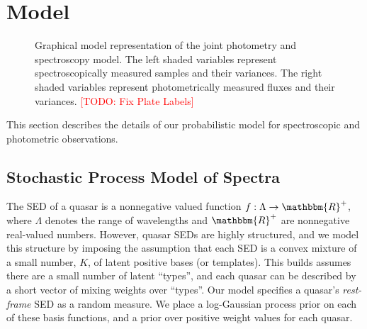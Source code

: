 \documentclass{article}
\newcommand{\R}{\mathbbm{R}}
\newcommand{\red}[1]{\textcolor{red}{[TODO: #1]}}
\begin{document}


\section{Model}

\begin{figure}

\caption{Graphical model representation of the joint photometry and spectroscopy model.  The left shaded variables represent spectroscopically measured samples and their variances.  The right shaded variables represent photometrically measured fluxes and their variances. \red{Fix Plate Labels} }
\end{figure}


\label{sec:model}
This section describes the details of our probabilistic model for spectroscopic and photometric observations.  

\subsection{Stochastic Process Model of Spectra}
The SED of a quasar is a nonnegative valued function $f : \Lambda \rightarrow \R^+$, where $\Lambda$ denotes the range of wavelengths and $\R^+$ are nonnegative real-valued numbers.  However, quasar SEDs are highly structured, and we model this structure by imposing the assumption that each SED is a convex mixture of a small number, $K$, of latent positive bases (or templates).  
This builds assumes there are a small number of latent ``types'', and each quasar can be described by a short vector of mixing weights over ``types''. 
Our model specifies a quasar's \emph{rest-frame} SED as a random measure. 
We place a log-Gaussian process prior on each of these basis functions, and a prior over positive weight values for each quasar.  
\end{document}
